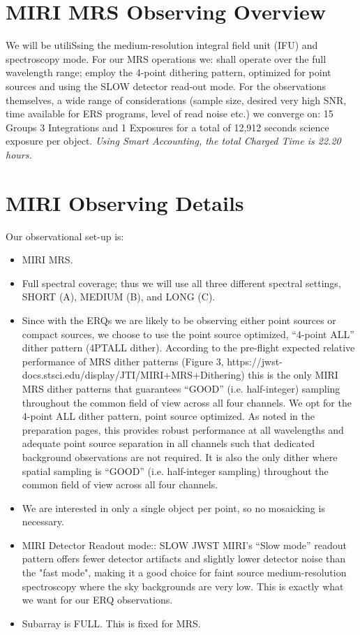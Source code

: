 \section*{MIRI MRS Observing Overview}
We will be utiliSsing the medium-resolution integral field unit (IFU) and spectroscopy mode.  
For our MRS operations we: shall operate over the full wavelength range; 
employ the 4-point dithering pattern, optimized for point sources and using the SLOW  detector read-out mode. For the observations themselves, a wide range of considerations (sample size, desired very high SNR, time available for ERS programs, level of read noise etc.) we converge on:
15 Groups
3 Integrations and 
1 Exposures for a total 
of 12,912 seconds science exposure per object.
{\it Using Smart Accounting, the total Charged Time is 22.20 hours.}


\section*{MIRI Observing Details}
Our observational set-up is:
\begin{itemize}
    \item MIRI MRS.  

    \item Full spectral coverage; thus we will use all three different spectral settings, SHORT (A), MEDIUM (B), and LONG (C).  

    \item Since with the ERQs we are likely to be observing
      either point sources or compact sources, we choose to use the point
      source optimized, ``4-point ALL'' dither pattern (4PTALL
      dither). According to the pre-flight expected relative performance of
      MRS dither patterns (Figure 3,
      https://jwst-docs.stsci.edu/display/JTI/MIRI+MRS+Dithering) this is
      the only MIRI MRS dither patterns that guarantees ``GOOD''
      (i.e. half-integer) sampling throughout the common field of view
      across all four channels.
        We opt for the 4-point ALL dither pattern, point source
        optimized.  As noted in the preparation pages, this provides robust
        performance at all wavelengths and adequate point source separation in
        all channels such that dedicated background observations are not
        required. It is also the only dither where spatial sampling is ``GOOD''
        (i.e. half-integer sampling) throughout the common field of view
        across all four channels.

    \item We are interested in only a single object per point, so no mosaicking is necessary.  

    \item{MIRI Detector Readout mode:: SLOW 
        JWST MIRI's ``Slow mode'' readout pattern offers fewer detector
        artifacts and slightly lower detector noise than the "fast mode",
        making it a good choice for faint source medium-resolution
        spectroscopy where the sky backgrounds are very low. This is 
        exactly what we want for our ERQ observations.}

    \item{Subarray is FULL. This is fixed for MRS.}
\end{itemize}

